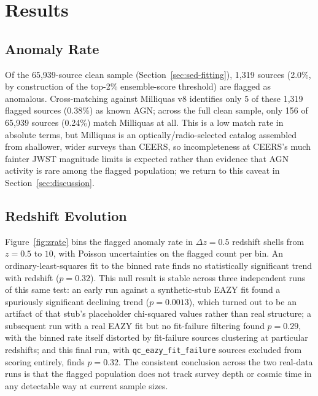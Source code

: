 \documentclass[twocolumn]{aastex631}
\begin{document}
\section{Results}
\label{sec:results}

\subsection{Anomaly Rate}
\label{sec:results-rate}

Of the 65,939-source clean sample (Section~\ref{sec:sed-fitting}), 1,319
sources (2.0\%, by construction of the top-2\% ensemble-score threshold)
are flagged as anomalous. Cross-matching against Milliquas v8 identifies
only 5 of these 1,319 flagged sources (0.38\%) as known AGN; across the
full clean sample, only 156 of 65,939 sources (0.24\%) match Milliquas at
all. This is a low match rate in absolute terms, but Milliquas is an
optically/radio-selected catalog assembled from shallower, wider surveys
than CEERS, so incompleteness at CEERS's much fainter JWST magnitude limits
is expected rather than evidence that AGN activity is rare among
the flagged population; we return to this caveat in
Section~\ref{sec:discussion}.

\subsection{Redshift Evolution}
\label{sec:results-redshift}

Figure~\ref{fig:zrate} bins the flagged anomaly rate in $\Delta z = 0.5$
redshift shells from $z=0.5$ to $10$, with Poisson uncertainties on the
flagged count per bin. An ordinary-least-squares fit to the binned rate
finds no statistically significant trend with redshift ($p=0.32$). This
null result is stable across three independent runs of this same test: an
early run against a synthetic-stub EAZY fit found a spuriously significant
declining trend ($p=0.0013$), which turned out to be an artifact of that
stub's placeholder chi-squared values rather than real structure; a
subsequent run with a real EAZY fit but no fit-failure filtering found
$p=0.29$, with the binned rate itself distorted by fit-failure sources
clustering at particular redshifts; and this final run, with
\texttt{qc\_eazy\_fit\_failure} sources excluded from scoring entirely,
finds $p=0.32$. The consistent conclusion across the two real-data runs
is that the flagged population does not track survey depth or cosmic time
in any detectable way at current sample sizes.
\end{document}
